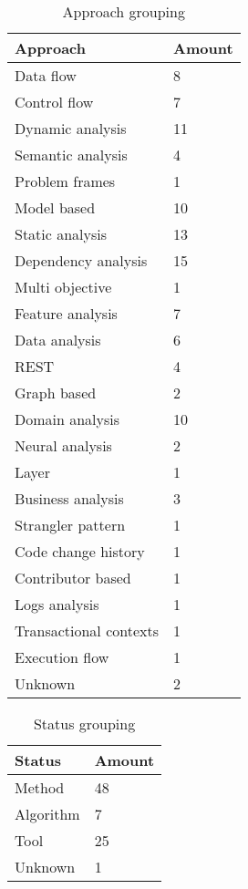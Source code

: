\begin{table}[!htb] \caption{Approach grouping} \label{tab:approach-grouping}
  \begin{center}
    \begin{tabular}[c]{p{12em}|p{4em}}
      \textbf{Approach} &
      \textbf{Amount} \\
      \hline Data flow & {8} \\
      \hline Control flow & {7} \\
      \hline Dynamic analysis & {11} \\
      \hline Semantic analysis & {4} \\
      \hline Problem frames & {1} \\
      \hline Model based & {10} \\
      \hline Static analysis & {13} \\
      \hline Dependency analysis & {15} \\
      \hline Multi objective & {1} \\
      \hline Feature analysis & {7} \\
      \hline Data analysis & {6} \\
      \hline REST & {4} \\
      \hline Graph based & {2} \\
      \hline Domain analysis & {10} \\
      \hline Neural analysis & {2} \\
      \hline Layer & {1} \\
      \hline Business analysis & {3} \\
      \hline Strangler pattern & {1} \\
      \hline Code change history & {1} \\
      \hline Contributor based & {1} \\
      \hline Logs analysis & {1} \\
      \hline Transactional contexts & {1} \\
      \hline Execution flow & {1} \\
      \hline Unknown & {2} \\
    \end{tabular}
  \end{center}
\end{table}

\begin{table}[!htb] \caption{Status grouping} \label{tab:status-grouping}
  \begin{center}
    \begin{tabular}[c]{p{12em}|p{4em}}
      \textbf{Status} &
      \textbf{Amount} \\
      \hline Method & {48} \\
      \hline Algorithm & {7} \\
      \hline Tool & {25} \\
      \hline Unknown & {1} \\
    \end{tabular}
  \end{center}
\end{table}

